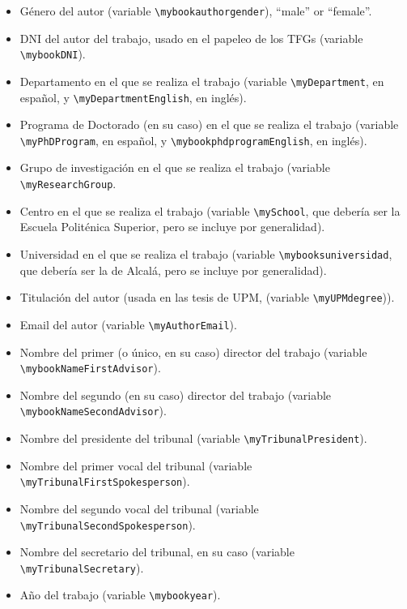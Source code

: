 \begin{itemize}
\item Género del autor (variable
  \texttt{\textbackslash{}mybookauthorgender}), ``male'' or ``female''.

\item DNI del autor del trabajo, usado en el papeleo de los TFGs
  (variable \texttt{\textbackslash{}mybookDNI}).
\item Departamento en el que se realiza el trabajo (variable
  \texttt{\textbackslash{}myDepartment}, en español, y
  \texttt{\textbackslash{}myDepartmentEnglish}, en inglés).
\item Programa de Doctorado (en su caso) en el que se realiza el trabajo (variable
  \texttt{\textbackslash{}myPhDProgram}, en español, y
  \texttt{\textbackslash{}mybookphdprogramEnglish}, en inglés). 
\item Grupo de investigación en el que se realiza el trabajo (variable
  \texttt{\textbackslash{}myResearchGroup}.
\item Centro en el que se realiza el trabajo (variable \texttt{\textbackslash{}mySchool}, que debería ser la Escuela Politénica Superior, pero se incluye por generalidad).
\item Universidad en el que se realiza el trabajo (variable \texttt{\textbackslash{}mybooksuniversidad}, que debería ser la de Alcalá, pero se incluye por generalidad).
\item Titulación del autor (usada en las tesis de UPM, (variable \texttt{\textbackslash{}myUPMdegree})).
\item Email del autor (variable \texttt{\textbackslash{}myAuthorEmail}).
\item Nombre del primer (o único, en su caso) director del trabajo
  (variable \texttt{\textbackslash{}mybookNameFirstAdvisor}).
\item Nombre del segundo (en su caso) director del trabajo (variable \texttt{\textbackslash{}mybookNameSecondAdvisor}).
\item Nombre del presidente del tribunal (variable \texttt{\textbackslash{}myTribunalPresident}).
\item Nombre del primer vocal del tribunal (variable \texttt{\textbackslash{}myTribunalFirstSpokesperson}).
\item Nombre del segundo vocal del tribunal (variable \texttt{\textbackslash{}myTribunalSecondSpokesperson}).
\item Nombre del secretario del tribunal, en su caso (variable \texttt{\textbackslash{}myTribunalSecretary}).
\item Año del trabajo (variable \texttt{\textbackslash{}mybookyear}).

\end{itemize}

